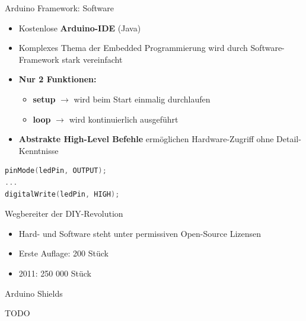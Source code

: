\documentclass{beamer}
\begin{document}
\begin{frame}[fragile]{Arduino Framework: Software}
\begin{itemize}
 \item Kostenlose \textbf{Arduino-IDE} (Java)
\end{itemize}
\begin{itemize}
 \item Komplexes Thema der Embedded Programmierung wird durch Software-Framework stark vereinfacht
\end{itemize}
\begin{itemize}
 \item \textbf{Nur 2 Funktionen:}
 \begin{itemize}
  \item \textbf{setup} $\rightarrow$ wird beim Start einmalig durchlaufen
  \item \textbf{loop} $\rightarrow$ wird kontinuierlich ausgef\"uhrt
 \end{itemize}
\end{itemize}
\begin{itemize}
 \item \textbf{Abstrakte High-Level Befehle} erm\"oglichen Hardware-Zugriff ohne Detail-Kenntnisse
\end{itemize}
\begin{lstlisting}[frame=single, language=C]
pinMode(ledPin, OUTPUT);
...
digitalWrite(ledPin, HIGH);
\end{lstlisting}
\end{frame}
\begin{frame}{Wegbereiter der DIY-Revolution}
\begin{itemize}
 \item Hard- und Software steht unter permissiven Open-Source Lizensen
\end{itemize}
\begin{itemize}
 \item Erste Auflage: 200 St\"uck
 \item 2011: 250 000 St\"uck
\end{itemize}
\end{frame}
\begin{frame}{Arduino Shields}
	\begin{large}TODO\end{large}
\end{frame}
\end{document}
